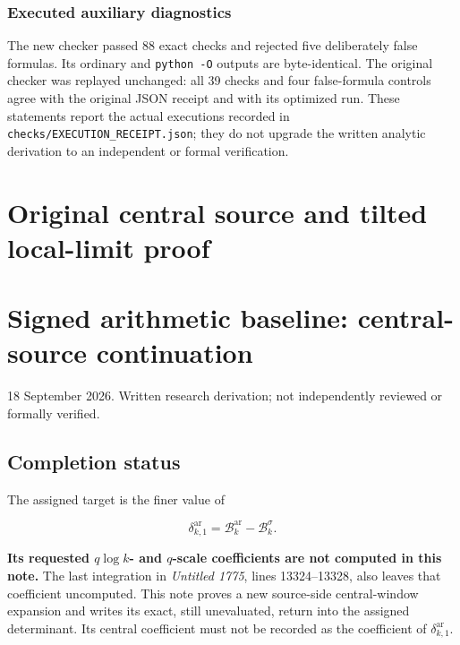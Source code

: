 \documentclass[11pt,a4paper]{article}
\begin{document}
\subsubsection{Executed auxiliary diagnostics}\label{loc:executed-auxiliary-diagnostics}

The new checker passed 88 exact checks and rejected five deliberately false formulas. Its ordinary and \texttt{python\ -O} outputs are byte-identical. The original checker was replayed unchanged: all 39 checks and four false-formula controls agree with the original JSON receipt and with its optimized run. These statements report the actual executions recorded in \texttt{checks/EXECUTION\_RECEIPT.json}; they do not upgrade the written analytic derivation to an independent or formal verification.

\endgroup

\clearpage
\begingroup


\setcounter{equation}{0}
\renewcommand{\theequation}{ACW.\arabic{equation}}
\section*{Original central source and tilted local-limit proof}
\section{Signed arithmetic baseline: central-source continuation}\label{acw:signed-arithmetic-baseline-central-source-continuation}

18 September 2026. Written research derivation; not independently reviewed or formally verified.

\subsection{Completion status}\label{acw:completion-status}

The assigned target is the finer value of

\[
\delta_{k,1}^{\mathrm{ar}}=\mathcal B_k^{\mathrm{ar}}-\mathcal B_k^\sigma.
\]

\textbf{Its requested \(q\log k\)- and \(q\)-scale coefficients are not computed in this note.} The last integration in \emph{Untitled 1775}, lines 13324--13328, also leaves that coefficient uncomputed. This note proves a new source-side central-window expansion and writes its exact, still unevaluated, return into the assigned determinant. Its central coefficient must not be recorded as the coefficient of \(\delta_{k,1}^{\mathrm{ar}}\).
\end{document}
